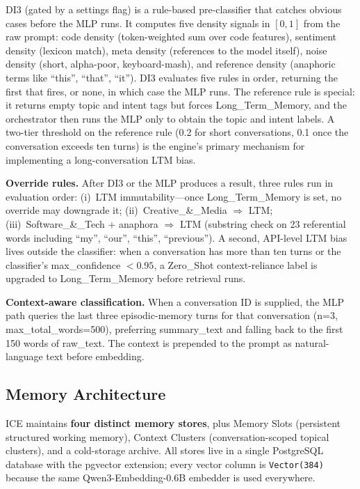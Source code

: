 \documentclass[11pt,a4paper]{article}
\begin{document}
DI3 (gated by a settings flag) is a rule-based pre-classifier that catches obvious cases before the MLP runs. It computes five density signals in $[0,1]$ from the raw prompt: code density (token-weighted sum over code features), sentiment density (lexicon match), meta density (references to the model itself), noise density (short, alpha-poor, keyboard-mash), and reference density (anaphoric terms like ``this'', ``that'', ``it''). DI3 evaluates five rules in order, returning the first that fires, or none, in which case the MLP runs. The reference rule is special: it returns empty topic and intent tags but forces Long\_Term\_Memory, and the orchestrator then runs the MLP only to obtain the topic and intent labels. A two-tier threshold on the reference rule (0.2 for short conversations, 0.1 once the conversation exceeds ten turns) is the engine's primary mechanism for implementing a long-conversation LTM bias.

\textbf{Override rules.} After DI3 or the MLP produces a result, three rules run in evaluation order: (i)~LTM immutability---once Long\_Term\_Memory is set, no override may downgrade it; (ii)~Creative\_\&\_Media $\Rightarrow$ LTM; (iii)~Software\_\&\_Tech + anaphora $\Rightarrow$ LTM (substring check on 23 referential words including ``my'', ``our'', ``this'', ``previous''). A second, API-level LTM bias lives outside the classifier: when a conversation has more than ten turns or the classifier's max\_confidence $< 0.95$, a Zero\_Shot context-reliance label is upgraded to Long\_Term\_Memory before retrieval runs.

\textbf{Context-aware classification.} When a conversation ID is supplied, the MLP path queries the last three episodic-memory turns for that conversation (n=3, max\_total\_words=500), preferring summary\_text and falling back to the first 150 words of raw\_text. The context is prepended to the prompt as natural-language text before embedding.

\subsection{Memory Architecture}

ICE maintains \textbf{four distinct memory stores}, plus Memory Slots (persistent structured working memory), Context Clusters (conversation-scoped topical clusters), and a cold-storage archive. All stores live in a single PostgreSQL database with the pgvector extension; every vector column is \texttt{Vector(384)} because the same Qwen3-Embedding-0.6B embedder is used everywhere.
\end{document}
